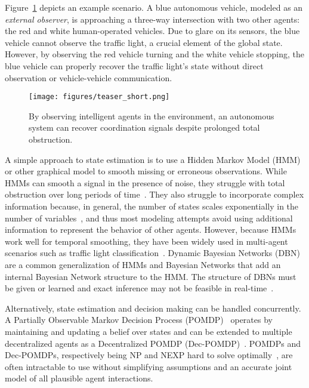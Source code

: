 \documentclass[letterpaper,10pt,conference]{ieeeconf}
\begin{document}
Figure~\ref{fig:teaser} depicts an example scenario. A blue autonomous vehicle, modeled as an \emph{external observer}, is approaching a three-way intersection with two other agents: the red and white human-operated vehicles. Due to glare on its sensors, the blue vehicle cannot observe the traffic light, a crucial element of the global state. However, by observing the red vehicle turning and the white vehicle stopping, the blue vehicle can properly recover the traffic light's state without direct observation or vehicle-vehicle communication. 

\begin{figure}[t]
    \centering
    \texttt{[image: figures/teaser\_short.png]}
    \caption{By observing intelligent agents in the environment, an autonomous system can recover coordination signals despite prolonged total obstruction.}
    \label{fig:teaser}
\end{figure}

A simple approach to state estimation is to use a Hidden Markov Model (HMM) or other graphical model to smooth missing or erroneous observations. While HMMs can smooth a signal in the presence of noise, they struggle with total obstruction over long periods of time~\cite{vaseghi1997noise}. They also struggle  to incorporate complex information because, in general, the number of states scales exponentially in the number of variables~\cite{ghahramani2001introduction,rabiner1986introduction}, and thus most modeling attempts avoid using additional information to represent the behavior of other agents. However, because HMMs work well for temporal smoothing, they have been widely used in multi-agent scenarios such as traffic light classification~\cite{dymarski2011hidden, gomez2014traffic}. Dynamic Bayesian Networks (DBN) are a common generalization of HMMs and Bayesian Networks that add an internal Bayesian Network structure to the HMM. The structure of DBNs must be given or learned and exact inference may not be feasible in real-time~\cite{murphy2002dynamic}. 

Alternatively, state estimation and decision making can be handled concurrently. A Partially Observable Markov Decision Process (POMDP)~\cite{kaelbling1998planning} operates by maintaining and updating a belief over states and can be extended to multiple decentralized agents as a Decentralized POMDP (Dec-POMDP)~\cite{oliehoek2016concise}. POMDPs and Dec-POMDPs, respectively being NP and NEXP hard to solve optimally~\cite{mundhenk2000complexity, bernstein2002complexity}, are often intractable to use without simplifying assumptions and an accurate joint model of all plausible agent interactions.
\end{document}
